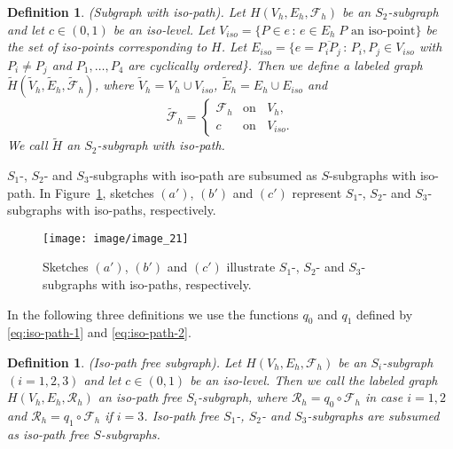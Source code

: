 \documentclass[a4paper,11pt]{article}
\newtheorem{definition}[theorem]{Definition}
\begin{document}
\begin{definition}(Subgraph with iso-path).
Let $H(V_h,E_h,\mathcal{F}_h)$ be an $S_2$-subgraph and let $c\in (0,1)$ be an iso-level.
Let $V_{iso}=\{P\in e\,:\,e\in E_h\; P\mbox{ an iso-point}\}$ be the set of iso-points
corresponding to $H$. Let $E_{iso}=\{e=\overline{P_iP_j}\,:\,P_i,P_j\in V_{iso}$ with $P_i\neq P_j$ and
$P_1,\ldots,P_4$ are cyclically ordered\}. Then we define a labeled graph
$\tilde{H}(\tilde{V}_h,\tilde{E}_h,\tilde{\mathcal{F}}_h)$, where $\tilde{V}_h=V_h\cup
V_{iso}$, $\tilde{E}_h=E_h\cup E_{iso}$ and
\begin{equation}
 \tilde{\mathcal{F}}_h=\left\{
   \begin{array}{ll}
     \mathcal{F}_h & \mbox{on }\;\; V_h, \\
     c & \mbox{on }\;\; V_{iso}.
   \end{array}\right.
\label{eq:iso-path-6}
\end{equation}
We call $\tilde{H}$ an $S_2$-subgraph with iso-path.
\label{def:iso-path-14}
\end{definition}
\noindent $S_1$-, $S_2$- and $S_3$-subgraphs with iso-path are subsumed as $S$-subgraphs with iso-path.
In Figure~\ref{image_21}, sketches $(a')$, $(b')$ and $(c')$ represent $S_1$-, $S_2$- and
$S_3$-subgraphs with iso-paths, respectively.
\begin{figure}[!ht]
\texttt{[image: image/image\_21]}
\caption{Sketches $(a')$, $(b')$ and $(c')$ illustrate $S_1$-, $S_2$- and $S_3$-subgraphs with
iso-paths, respectively.}
\label{image_21}
\end{figure}
\FloatBarrier
In the following three definitions we use the functions $q_0$ and $q_1$ defined by \eqref{eq:iso-path-1} and
\eqref{eq:iso-path-2}.
\begin{definition}(Iso-path free subgraph).
Let $H(V_h,E_h,\mathcal{F}_h)$ be an $S_i$-subgraph $(i=1,2,3)$ and let $c\in (0,1)$ be an iso-level.
Then we call the labeled graph $H(V_h,E_h,\mathcal{R}_h)$ an iso-path free $S_i$-subgraph, where
$\mathcal{R}_h=q_0\circ\mathcal{F}_h$ in case $i=1,2$ and $\mathcal{R}_h=q_1\circ\mathcal{F}_h$ if
$i=3$. Iso-path free $S_1$-, $S_2$- and $S_3$-subgraphs are subsumed as iso-path free $S$-subgraphs.
\label{def:iso-path-16-17-18}
\end{definition}
\end{document}
